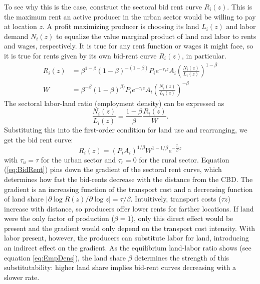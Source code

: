 \documentclass[12pt]{article}
\begin{document}
To see why this is the case, construct the sectoral bid rent curve $R_i(z)$. This is the maximum rent an active producer in the urban sector would be willing to pay at location $z$. %
A profit maximizing producer is choosing its land $L_i(z)$ and labor demand $N_i(z)$ to equalize the value marginal product of land and labor to rents and wages, respectively. It is true for any rent function or wages it might face, so it is true for rents given by its own bid-rent curve $R_i(z)$, in particular.
\begin{align}
R_i(z) &=\beta^{1-\beta}(1-\beta)^{-(1-\beta)} P_ie^{-\tau_i z}A_i \left(\frac{N_i(z)}{L_i(z)}\right)^{1-\beta}\\
W &=\beta^{-\beta}(1-\beta)^{\beta)} P_ie^{-\tau_i z}A_i \left(\frac{N_i(z)}{L_i(z)}\right)^{-\beta}
\end{align}
The sectoral labor-land ratio (employment density) can be expressed as
\begin{equation}
\label{eq:EmpDens}
\frac{N_i(z)}{L_i(z)} = \frac{1-\beta}{\beta}\frac{R_i(z)}{W}.
\end{equation}
Substituting this into the first-order condition for land use and rearranging, we get the bid rent curve:
\begin{equation}
\label{eq:BidRent}
R_i(z) =(P_iA_i)^{1/\beta} W^{1-1/\beta} e^{-\frac{\tau_i}{\beta} z}
\end{equation}
with $\tau_u=\tau$ for the urban sector and $\tau_r=0$ for the rural sector. Equation (\ref{eq:BidRent}) pins down the gradient of the sectoral rent curve, which determines how fast the bid-rents decrease with the distance from the CBD. The gradient is an increasing function of the transport cost and a decreasing function of land share $|\partial\log R(z)/\partial \log z|=\tau/\beta$. Intuitively, transport costs ($\tau z$) increase with distance, so producers offer lower rents for farther locations. If land were the only factor of production ($\beta=1$), only this direct effect would be present and the gradient would only depend on the transport cost intensity. With labor present, however, the producers can substitute labor for land, introducing an indirect effect on the gradient. As the equilibrium land-labor ratio shows (see equation \ref{eq:EmpDens}), the land share $\beta$ determines the strength of this substitutability: higher land share implies bid-rent curves decreasing with a slower rate.
\end{document}
